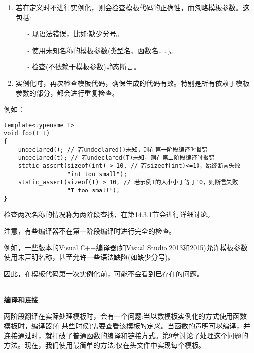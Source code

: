 \begin{enumerate}
\item 
若在定义时不进行实例化，则会检查模板代码的正确性，而忽略模板参数。这包括:
\begin{itemize}
\item[-] 
现语法错误，比如:缺少分号。

\item[-]
使用未知名称的模板参数(类型名、函数名……)。

\item[-]
检查(不依赖于模板参数)静态断言。
\end{itemize}

\item 
实例化时，再次检查模板代码，确保生成的代码有效。特别是所有依赖于模板参数的部分，都会进行重复检查。
\end{enumerate}

例如：

\begin{lstlisting}[style=styleCXX]
template<typename T>
void foo(T t)
{
	undeclared(); // 若undeclared()未知，则在第一阶段编译时报错
	undeclared(t); // 若undeclared(T)未知，则在第二阶段编译时报错
	static_assert(sizeof(int) > 10, // 若sizeof(int)<=10，始终断言失败
				  "int too small");
	static_assert(sizeof(T) > 10, // 若示例T的大小小于等于10，则断言失败
	              "T too small");
}
\end{lstlisting}

检查两次名称的情况称为两阶段查找，在第14.3.1节会进行详细讨论。

注意，有些编译器不在第一阶段编译时进行完全的检查。

\begin{tcolorbox}[colback=webgreen!5!white,colframe=webgreen!75!black]
\hspace*{0.75cm}例如，一些版本的Visual C++编译器(如Visual Studio 2013和2015)允许模板参数使用未声明名称，甚至允许一些语法缺陷(如缺少分号)。
\end{tcolorbox}

因此，在模板代码第一次实例化前，可能不会看到已存在的问题。

\hspace*{\fill} \\ %
\noindent
\textbf{编译和连接}

两阶段翻译在实际处理模板时，会有一个问题:当以数模板实例化的方式使用函数模板时，编译器(在某些时候)需要查看该模板的定义。当函数的声明可以编译，并连接通过时，就打破了普通函数的编译和链接方式。第9章讨论了处理这个问题的方法。现在，我们使用最简单的方法:仅在头文件中实现每个模板。








